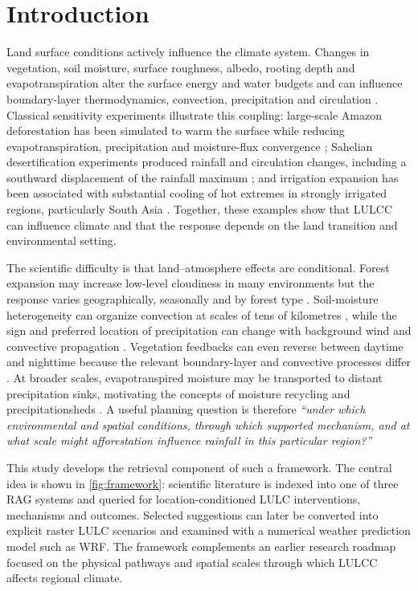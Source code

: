 \documentclass[10pt,twocolumn]{article}
\begin{document}
\section{Introduction}

Land surface conditions actively influence the climate system. Changes in vegetation, soil moisture, surface roughness, albedo, rooting depth and evapotranspiration alter the surface energy and water budgets and can influence boundary-layer thermodynamics, convection, precipitation and circulation \cite{pielke2007,cao2020,spracklen2018}. Classical sensitivity experiments illustrate this coupling: large-scale Amazon deforestation has been simulated to warm the surface while reducing evapotranspiration, precipitation and moisture-flux convergence \cite{shukla1990}; Sahelian desertification experiments produced rainfall and circulation changes, including a southward displacement of the rainfall maximum \cite{xue1993}; and irrigation expansion has been associated with substantial cooling of hot extremes in strongly irrigated regions, particularly South Asia \cite{thiery2020}. Together, these examples show that LULCC can influence climate and that the response depends on the land transition and environmental setting.

The scientific difficulty is that land--atmosphere effects are conditional. Forest expansion may increase low-level cloudiness in many environments but the response varies geographically, seasonally and by forest type \cite{duveiller2021}. Soil-moisture heterogeneity can organize convection at scales of tens of kilometres \cite{taylor2011}, while the sign and preferred location of precipitation can change with background wind and convective propagation \cite{froidevaux2014}. Vegetation feedbacks can even reverse between daytime and nighttime because the relevant boundary-layer and convective processes differ \cite{klein2017}. At broader scales, evapotranspired moisture may be transported to distant precipitation sinks, motivating the concepts of moisture recycling and precipitationsheds \cite{keys2012,keys2016,wangerlandsson2018}. A useful planning question is therefore \emph{``under which environmental and spatial conditions, through which supported mechanism, and at what scale might afforestation influence rainfall in this particular region?''}


This study develops the retrieval component of such a framework. The central idea is shown in \cref{fig:framework}: scientific literature is indexed into one of three RAG systems and queried for location-conditioned LULC interventions, mechanisms and outcomes. Selected suggestions can later be converted into explicit raster LULC scenarios and examined with a numerical weather prediction model such as WRF. The framework complements an earlier research roadmap focused on the physical pathways and spatial scales through which LULCC affects regional climate.
\end{document}
